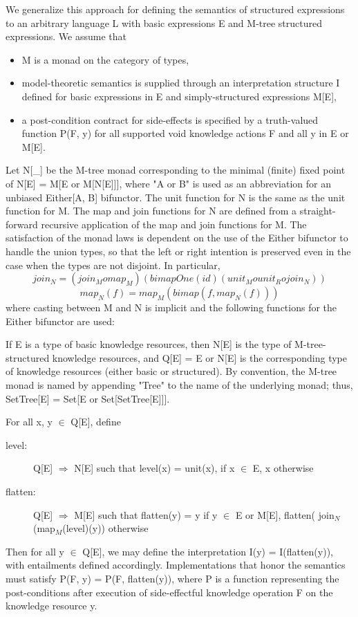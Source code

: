 \documentclass[runningheads]{llncs}
\begin{document}
We generalize this approach for defining the semantics of structured expressions to an arbitrary language L with basic expressions E and M-tree structured expressions. We assume that 
\begin{itemize}
\item M is a monad on the category of types,
\item model-theoretic semantics is supplied through an interpretation structure I defined for basic expressions in E and simply-structured expressions M[E],
\item a post-condition contract for side-effects is specified by a truth-valued function P(F, y) for all supported void knowledge actions F and all y in E or M[E].
\end{itemize}

Let N[\_] be the M-tree monad corresponding to the minimal (finite) fixed point of N[E] = M[E or M[N[E]]], where "A or B" is used as an abbreviation for an unbiased Either[A, B] bifunctor.
The unit function for N is the same as the unit function for M.
The map and join functions for N are defined from a straight-forward recursive application of the map and join functions for M.
The satisfaction of the monad laws is dependent on the use of the Either bifunctor to handle the union types, so that the left or right intention is preserved even in the case when the types are not disjoint. In particular,
$$join_N = (join_M o map_M)( bimapOne( id) (unit_M o unit_R o join_N) ) $$
$$ map_N(f) = map_M( bimap(f, map_N(f)) ) $$
 where casting between M and N is implicit and the following functions for the Either bifunctor are used:
 
If E is a type of basic knowledge resources, then N[E] is the type of M-tree-structured knowledge resources, and
Q[E] = E or N[E] is the corresponding type of knowledge resources (either basic or structured). By convention, the M-tree monad is named by appending "Tree" to the name of the underlying monad; thus, SetTree[E] = Set[E or Set[SetTree[E]]].

For all x, y $\in$ Q[E], define
\begin{description}
\item[level:] Q[E] $\Rightarrow$ N[E]
such that level(x) = unit(x), if x $\in$ E, x otherwise
\item[flatten:] Q[E] $\Rightarrow$ M[E]  
such that flatten(y) = y if y $\in$  E or M[E], flatten( join$_N$(map$_M$(level)(y)) otherwise
\end{description}
Then for all y $\in$ Q[E], we may define the interpretation I(y) = I(flatten(y)), with entailments defined accordingly. %
Implementations that honor the semantics must satisfy P(F, y) = P(F, flatten(y)), where P is a function representing the post-conditions after execution of side-effectful knowledge operation F on the knowledge resource y.
\end{document}
